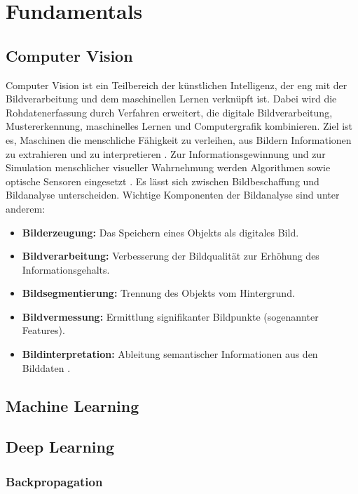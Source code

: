 \chapter{Fundamentals}
\label{ch:fundamentals}

\section{Computer Vision}
Computer Vision ist ein Teilbereich der künstlichen Intelligenz, der eng mit der Bildverarbeitung und dem maschinellen Lernen verknüpft ist. Dabei wird die Rohdatenerfassung durch Verfahren erweitert, die digitale Bildverarbeitung, Mustererkennung, maschinelles Lernen und Computergrafik kombinieren. Ziel ist es, Maschinen die menschliche Fähigkeit zu verleihen, aus Bildern Informationen zu extrahieren und zu interpretieren \cite{Wiley2018}. Zur Informationsgewinnung und zur Simulation menschlicher visueller Wahrnehmung werden Algorithmen sowie optische Sensoren eingesetzt \cite{Matiacevich2013}. Es lässt sich zwischen Bildbeschaffung und Bildanalyse unterscheiden. Wichtige Komponenten der Bildanalyse sind unter anderem: 
\begin{itemize}
    \item \textbf{Bilderzeugung:} Das Speichern eines Objekts als digitales Bild.
    \item \textbf{Bildverarbeitung:} Verbesserung der Bildqualität zur Erhöhung des Informationsgehalts.
    \item \textbf{Bildsegmentierung:} Trennung des Objekts vom Hintergrund.
    \item \textbf{Bildvermessung:} Ermittlung signifikanter Bildpunkte (sogenannter Features).
    \item \textbf{Bildinterpretation:} Ableitung semantischer Informationen aus den Bilddaten \cite{Mery2013}.
\end{itemize}



\section{Machine Learning}
\section{Deep Learning}
\subsection{Backpropagation}

